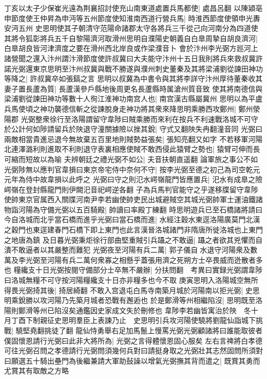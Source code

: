 丁亥以太子少保崔光遠為荆襄招討使充山南東道處置兵馬都使|{
	處昌呂翻}
以陳潁亳申節度使王仲昇為申沔等五州節度使知淮南西道行營兵馬|{
	時淮西節度使領申光夀安沔五州}
史思明使其子朝清守范陽命諸郡太守各將兵三千從己向河南分為四道使其將令狐彰將兵五千自黎陽濟河取滑州思明自濮陽史朝義自白臯周摯自胡良濟河|{
	白臯胡良皆河津濟度之要在滑州西北岸良或作梁濮音卜}
會於汴州李光弼方廵河上諸營聞之還入汴州謂汴滑節度使許叔冀曰大夫能守汴州十五日我則將兵來救叔冀許諾光弼還東京思明至汴州叔冀與戰不勝遂與濮州刺史董秦及其將梁浦劉從諫田神功等降之|{
	許叔冀卒如張鎬之言}
思明以叔冀為中書令與其將李詳守汴州厚待董秦收其妻子置長蘆為質|{
	長蘆漢參戶縣地後周更名長蘆縣時属滄州質音致}
使其將南德信與梁浦劉從諫田神功等數十人徇江淮神功南宫人也|{
	南宫漢古縣屬冀州}
思明以為平盧兵馬使頃之神功襲德信斬之從諫脫身走神功將其衆來降思明乘勝西攻鄭州|{
	鄭州滎陽郡}
光弼整衆徐行至洛陽謂留守韋陟曰賊乘勝而來利在按兵不利速戰洛城不可守於公計何如陟請留兵於陜退守潼關據險以挫其銳|{
	守式又翻陜失冉翻潼音同}
光弼曰兩敵相當貴進忌退今無故棄五百里地則賊勢益張矣|{
	張知亮翻又如字}
不若移軍河陽北連澤潞利則進取不利則退守表裏相應使賊不敢西侵此猿臂之勢也|{
	猿臂可伸而長可縮而短故以為喻}
夫辨朝廷之禮光弼不如公|{
	夫音扶朝直遥翻}
論軍旅之事公不如光弼陟無以應判官韋損曰東京帝宅侍中奈何不守|{
	按李光弼至德之初己為司空乾元元年為侍中故韋損以此呼之}
光弼曰守之則氾水崿嶺龍門皆應置兵|{
	汜水有成臯之險崿嶺在登封縣龍門則伊闕汜音祀崿逆各翻}
子為兵馬判官能守之乎遂移牒留守韋陟使帥東京官属西入關牒河南尹李若幽使帥吏民出城避賊空其城光弼帥軍士運油鐵諸物詣河陽為守備光弼以五百騎殿|{
	帥讀曰率殿丁練翻}
時思明遊兵已至石橋諸將請曰今自洛城而北乎當石橋而進乎光弼曰當石橋而進|{
	水經注穀水東逕洛陽廣莫門北漢之穀門也東逕建春門石橋下即上東門也此言漢晉洛城諸門非隋唐所徙洛城也上東門之地唐為鎮}
及日暮光弼秉炬徐行部曲堅重賊引兵躡之不敢逼|{
	躡之者欲其兇懼而自潰不敢逼者以其嚴整而難犯}
光弼夜至河陽有兵二萬|{
	郭子儀自水退守河陽衆及數萬及李光弼至河陽有兵二萬何衆寡之相懸乎蓋張用濟之死朔方士卒畏威而迯散者多也}
糧纔支十日光弼按閱守備部分士卒無不嚴辦|{
	分扶問翻　考異曰實録光弼謂韋陟曰洛城無糧不可守按河陽糧纔支十日亦非糧多也今不取}
庚寅思明入洛陽城空無所得畏光弼掎其後|{
	掎居綺翻}
不敢入宫退屯白馬寺南築月城於河陽南以拒光弼|{
	史思明乘銳勝以攻河陽乃先築月城者恐戰有邂逅也}
於是鄭滑等州相繼陷沒|{
	思明既至洛陽則鄭滑等州已陷沒矣通鑑因史家成文失於刪修也}
韋陟李若幽皆寓治於陜　冬十月丁酉下制親征史思明羣臣上表諫乃止　史思明引兵攻河陽使驍將劉龍仙詣城下挑戰|{
	驍堅堯翻挑徒了翻}
龍仙恃勇舉右足加馬鬛上慢罵光弼光弼顧諸將曰誰能取彼者僕固懷恩請行光弼曰此非大將所為|{
	光弼之言得體懷恩固心服矣}
左右言禆將白孝德可往光弼召問之孝德請行光弼問須幾何兵對曰請挺身取之光弼壯其志然固問所須對曰願選五十騎出壘門為後繼兼請大軍助鼔譟以增氣光弼撫其背而遣之|{
	既賞其勇而尤賞其有取敵之方略}
